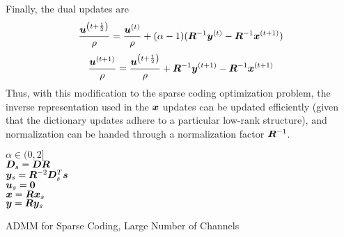 %
Finally, the dual updates are 
\begin{equation}
\frac{\bm{u}^{\left(t + \frac{1}{2}\right)}}{\rho} = \frac{\bm{u}^{(t)}}{\rho} + (\alpha - 1)(\bm{R}^{-1}\bm{y}^{(t)} - \bm{R}^{-1}\bm{x}^{(t + 1)})
\end{equation}
%
\begin{equation}
\frac{\bm{u}^{(t + 1)}}{\rho} = \frac{\bm{u}^{\left(t + \frac{1}{2}\right)}}{\rho} + \bm{R}^{-1}\bm{y}^{(t + 1)} - \bm{R}^{-1}\bm{x}^{(t + 1)}
\end{equation}
%
Thus, with this modification to the sparse coding optimization problem, the inverse representation used in the $\bm{x}$ updates can be updated efficiently (given that the dictionary updates adhere to a particular low-rank structure), and normalization can be handed through a normalization factor $\bm{R}^{-1}$.


\begin{algorithm}[h]
\SetAlgoLined
   $\alpha \in (0,2]$ \\
   $\bm{D}_s = \bm{D}\bm{R}$  \\
   $\bm{y}_s = \bm{R}^{-2}\bm{D}_s^T\bm{s}$ \\
   $\bm{u}_s = \bm{0}$ \\
  $\bm{x} = \bm{R}\bm{x}_s$ \\
  $\bm{y} = \bm{R}\bm{y}_s$
 \caption{ADMM for Sparse Coding, Large Number of Channels}
\end{algorithm}

